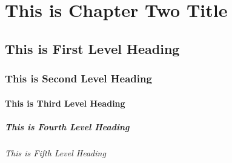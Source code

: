 
\chapter{This is Chapter Two Title}

\section{This is First Level Heading}
\lipsum[1-2]

\subsection{This is Second Level Heading}
\lipsum[3]

\subsubsection{This is Third Level Heading}
\lipsum[4]

\paragraph{This is Fourth Level Heading}
\lipsum[5]

\subparagraph{This is Fifth Level Heading}
\lipsum[6]
